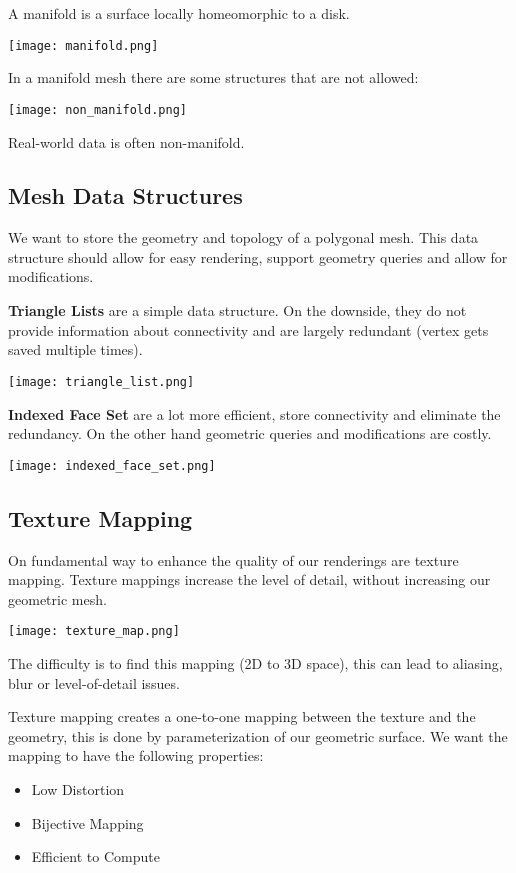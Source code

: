 A manifold is a surface locally homeomorphic to a disk.
\begin{center}
	\texttt{[image: manifold.png]}
\end{center}

In a manifold mesh there are some structures that are not allowed:
\begin{center}
	\texttt{[image: non\_manifold.png]}
\end{center}

Real-world data is often non-manifold.


\subsection{Mesh Data Structures}

We want to store the geometry and topology of a polygonal mesh. This data structure should allow for easy rendering, support geometry queries and allow for modifications. \medskip

\textbf{Triangle Lists} are a simple data structure. On the downside, they do not provide information about connectivity and are largely redundant (vertex gets saved multiple times).
\begin{center}
	\texttt{[image: triangle\_list.png]}
\end{center}

\textbf{Indexed Face Set} are a lot more efficient, store connectivity and eliminate the redundancy. On the other hand geometric queries and modifications are costly.
\begin{center}
	\texttt{[image: indexed\_face\_set.png]}
\end{center}


\subsection{Texture Mapping}

On fundamental way to enhance the quality of our renderings are texture mapping. Texture mappings increase the level of detail, without increasing our geometric mesh.
\begin{center}
	\texttt{[image: texture\_map.png]}
\end{center}

The difficulty is to find this mapping (2D to 3D space), this can lead to aliasing, blur or level-of-detail issues. \medskip

Texture mapping creates a one-to-one mapping between the texture and the geometry, this is done by parameterization of our geometric surface. We want the mapping to have the following properties:
\begin{itemize}
	\item Low Distortion
	\item Bijective Mapping
	\item Efficient to Compute
\end{itemize}

